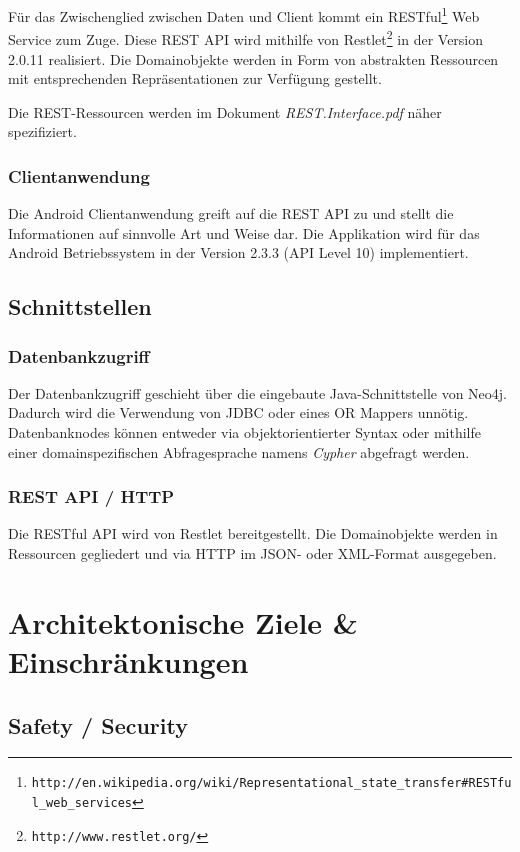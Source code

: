 \documentclass[10pt,a4paper]{scrartcl}
\begin{document}
Für das Zwischenglied zwischen Daten und Client kommt ein
RESTful\footnote{\texttt{http://en.wikipedia.org/wiki/Representational\_state\_transfer\#RESTful\_web\_services}}
Web Service zum Zuge. Diese REST API wird mithilfe von
Restlet\footnote{\texttt{http://www.restlet.org/}} in der Version 2.0.11 realisiert. Die Domainobjekte werden in Form von
abstrakten Ressourcen mit entsprechenden Repräsentationen zur Verfügung gestellt.

Die REST-Ressourcen werden im Dokument \textit{REST.Interface.pdf} näher spezifiziert.

\subsubsection{Clientanwendung}

Die Android Clientanwendung greift auf die REST API zu und stellt die Informationen auf sinnvolle
Art und Weise dar. Die Applikation wird für das Android Betriebssystem in der Version 2.3.3
(API Level 10) implementiert.


\subsection{Schnittstellen}

\subsubsection{Datenbankzugriff}

Der Datenbankzugriff geschieht über die eingebaute Java-Schnittstelle von Neo4j. Dadurch wird die
Verwendung von JDBC oder eines OR Mappers unnötig. Datenbanknodes können entweder via
objektorientierter Syntax oder mithilfe einer domainspezifischen Abfragesprache namens
\textit{Cypher} abgefragt werden.

\subsubsection{REST API / HTTP}

Die RESTful API wird von Restlet bereitgestellt. Die Domainobjekte werden in Ressourcen gegliedert
und via HTTP im JSON- oder XML-Format ausgegeben.


\section{Architektonische Ziele \& Einschränkungen}

\subsection{Safety / Security}
\end{document}
